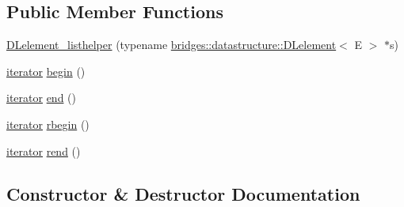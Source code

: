 \subsection*{Public Member Functions}
\begin{DoxyCompactItemize}
\item 
\hyperlink{classbridges_1_1datastructure_1_1_d_lelement_1_1_d_lelement__listhelper_afa61fdecd0ce37512ffa7bf89e0383cd}{D\+Lelement\+\_\+listhelper} (typename \hyperlink{classbridges_1_1datastructure_1_1_d_lelement}{bridges\+::datastructure\+::\+D\+Lelement}$<$ E $>$ $\ast$s)
\item 
\hyperlink{classbridges_1_1datastructure_1_1_d_lelement_1_1_d_lelement__listhelper_1_1iterator}{iterator} \hyperlink{classbridges_1_1datastructure_1_1_d_lelement_1_1_d_lelement__listhelper_a2739518ed5c02b3f8e97c23a777a0b59}{begin} ()
\item 
\hyperlink{classbridges_1_1datastructure_1_1_d_lelement_1_1_d_lelement__listhelper_1_1iterator}{iterator} \hyperlink{classbridges_1_1datastructure_1_1_d_lelement_1_1_d_lelement__listhelper_a1570c3746046008ce249cb9843a16be6}{end} ()
\item 
\hyperlink{classbridges_1_1datastructure_1_1_d_lelement_1_1_d_lelement__listhelper_1_1iterator}{iterator} \hyperlink{classbridges_1_1datastructure_1_1_d_lelement_1_1_d_lelement__listhelper_aa0e15872d603e1712d1c3fee6d16a630}{rbegin} ()
\item 
\hyperlink{classbridges_1_1datastructure_1_1_d_lelement_1_1_d_lelement__listhelper_1_1iterator}{iterator} \hyperlink{classbridges_1_1datastructure_1_1_d_lelement_1_1_d_lelement__listhelper_aaad384a46635fdb9c4d2e076ed988bb3}{rend} ()
\end{DoxyCompactItemize}


\subsection{Constructor \& Destructor Documentation}
\mbox{\label{classbridges_1_1datastructure_1_1_d_lelement_1_1_d_lelement__listhelper_afa61fdecd0ce37512ffa7bf89e0383cd}} 
